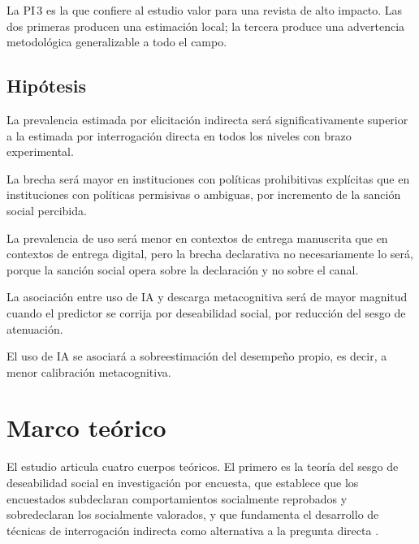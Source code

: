 \documentclass[11pt,a4paper]{article}
\begin{document}
La PI\,3 es la que confiere al estudio valor para una revista de alto impacto. Las dos primeras producen una estimación local; la tercera produce una advertencia metodológica generalizable a todo el campo.

\subsection{Hipótesis}

\begin{description}[leftmargin=3.3em,style=nextline,itemsep=0.4em]
	\item[\textbf{H\,1}] La prevalencia estimada por elicitación indirecta será significativamente superior a la estimada por interrogación directa en todos los niveles con brazo experimental.
	\item[\textbf{H\,2}] La brecha será mayor en instituciones con políticas prohibitivas explícitas que en instituciones con políticas permisivas o ambiguas, por incremento de la sanción social percibida.
	\item[\textbf{H\,3}] La prevalencia de uso será menor en contextos de entrega manuscrita que en contextos de entrega digital, pero la brecha declarativa no necesariamente lo será, porque la sanción social opera sobre la declaración y no sobre el canal.
	\item[\textbf{H\,4}] La asociación entre uso de IA y descarga metacognitiva será de mayor magnitud cuando el predictor se corrija por deseabilidad social, por reducción del sesgo de atenuación.
	\item[\textbf{H\,5}] El uso de IA se asociará a sobreestimación del desempeño propio, es decir, a menor calibración metacognitiva.
\end{description}

\section{Marco teórico}

El estudio articula cuatro cuerpos teóricos. El primero es la teoría del sesgo de deseabilidad social en investigación por encuesta, que establece que los encuestados subdeclaran comportamientos socialmente reprobados y sobredeclaran los socialmente valorados, y que fundamenta el desarrollo de técnicas de interrogación indirecta como alternativa a la pregunta directa \citep{coutts2011sensitive}.
\end{document}
